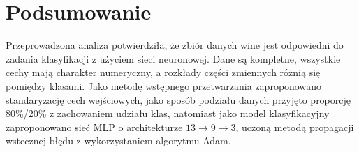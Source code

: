 \section{Podsumowanie}

Przeprowadzona analiza potwierdziła, że zbiór danych wine jest odpowiedni do zadania klasyfikacji z użyciem sieci neuronowej. Dane są kompletne, wszystkie cechy mają charakter numeryczny, a rozkłady części zmiennych różnią się pomiędzy klasami. Jako metodę wstępnego przetwarzania zaproponowano standaryzację cech wejściowych, jako sposób podziału danych przyjęto proporcję 80\%/20\% z zachowaniem udziału klas, natomiast jako model klasyfikacyjny zaproponowano sieć MLP o architekturze $13 \rightarrow 9 \rightarrow 3$, uczoną metodą propagacji wstecznej błędu z wykorzystaniem algorytmu Adam.